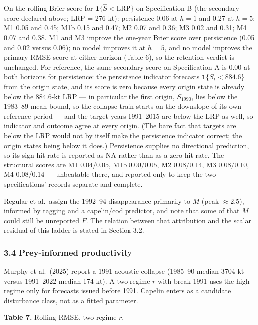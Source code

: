 \documentclass[11pt]{article}
\begin{document}
On the rolling Brier score for \(\mathbf{1}\{\hat S<\mathrm{LRP}\}\) on
Specification B (the secondary score declared above; LRP = 276 kt):
persistence 0.06 at \(h{=}1\) and 0.27 at \(h{=}5\); M1 0.05 and 0.45;
M1b 0.15 and 0.47; M2 0.07 and 0.36; M3 0.02 and 0.31; M4 0.07 and 0.38.
M1 and M3 improve the one-year Brier score over persistence (0.05 and
0.02 versus 0.06); no model improves it at \(h{=}5\), and no model
improves the primary RMSE score at either horizon (Table 6), so the
retention verdict is unchanged. For reference, the same secondary score
on Specification A is 0.00 at both horizons for persistence: the
persistence indicator forecasts \(\mathbf{1}\{S_t<884.6\}\) from the
origin state, and its score is zero because every origin state is
already below the 884.6-kt LRP --- in particular the first origin,
\(S_{1990}\), lies below the 1983--89 mean bound, so the collapse train
starts on the downslope of its own reference period --- and the target
years 1991--2015 are below the LRP as well, so indicator and outcome
agree at every origin. (The bare fact that targets are below the LRP
would not by itself make the persistence indicator correct; the origin
states being below it does.) Persistence supplies no directional prediction, so its sign-hit rate
is reported as NA rather than as a zero hit rate. The structural
scores are M1 0.04/0.05, M1b
0.00/0.05, M2 0.08/0.14, M3 0.08/0.10, M4 0.08/0.14 --- unbeatable
there, and reported only to keep the two specifications' records
separate and complete.

Regular et al.~assign the 1992--94 disappearance primarily to \(M\)
(peak \(\approx 2.5\)), informed by tagging and a capelin/cod predictor,
and note that some of that \(M\) could still be unreported \(F\). The
relation between that attribution and the scalar residual of this ladder
is stated in Section 3.2.

\subsubsection{3.4 Prey-informed
productivity}\label{prey-informed-productivity}

Murphy et al.~(2025) report a 1991 acoustic collapse (1985--90 median
3704 kt versus 1991--2022 median 174 kt). A two-regime \(r\) with break
1991 uses the high regime only for forecasts issued before 1991. Capelin
enters as a candidate disturbance class, not as a fitted parameter.

\textbf{Table 7.} Rolling RMSE, two-regime \(r\).
\end{document}

